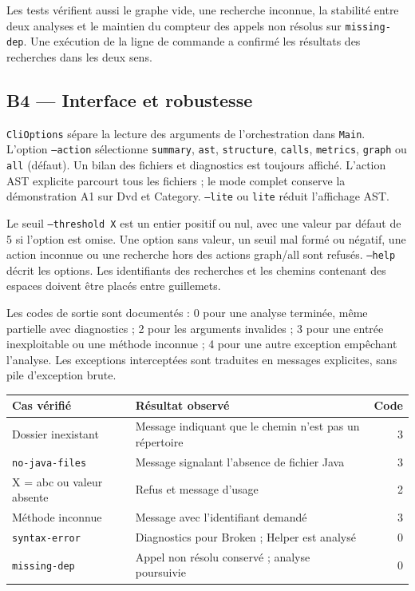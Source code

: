 \documentclass[11pt,a4paper]{article}
\newcommand{\code}[1]{\texttt{#1}}
\begin{document}
Les tests vérifient aussi le graphe vide, une recherche inconnue, la stabilité entre deux analyses et le maintien du compteur des appels non résolus sur \code{missing-dep}. Une exécution de la ligne de commande a confirmé les résultats des recherches dans les deux sens.

\subsection{B4 --- Interface et robustesse}
\code{CliOptions} sépare la lecture des arguments de l'orchestration dans \code{Main}. L'option \code{--action} sélectionne \code{summary}, \code{ast}, \code{structure}, \code{calls}, \code{metrics}, \code{graph} ou \code{all} (défaut). Un bilan des fichiers et diagnostics est toujours affiché. L'action AST explicite parcourt tous les fichiers ; le mode complet conserve la démonstration A1 sur Dvd et Category. \code{--lite} ou \code{lite} réduit l'affichage AST.

Le seuil \code{--threshold X} est un entier positif ou nul, avec une valeur par défaut de 5 si l'option est omise. Une option sans valeur, un seuil mal formé ou négatif, une action inconnue ou une recherche hors des actions graph/all sont refusés. \code{--help} décrit les options. Les identifiants des recherches et les chemins contenant des espaces doivent être placés entre guillemets.

Les codes de sortie sont documentés : 0 pour une analyse terminée, même partielle avec diagnostics ; 2 pour les arguments invalides ; 3 pour une entrée inexploitable ou une méthode inconnue ; 4 pour une autre exception empêchant l'analyse. Les exceptions interceptées sont traduites en messages explicites, sans pile d'exception brute.

\begin{center}
\begin{tabularx}{\textwidth}{lXr}
\toprule
Cas vérifié & Résultat observé & Code\\
\midrule
Dossier inexistant & Message indiquant que le chemin n'est pas un répertoire & 3\\
\code{no-java-files} & Message signalant l'absence de fichier Java & 3\\
X = abc ou valeur absente & Refus et message d'usage & 2\\
Méthode inconnue & Message avec l'identifiant demandé & 3\\
\code{syntax-error} & Diagnostics pour Broken ; Helper est analysé & 0\\
\code{missing-dep} & Appel non résolu conservé ; analyse poursuivie & 0\\
\bottomrule
\end{tabularx}
\end{center}
\end{document}
